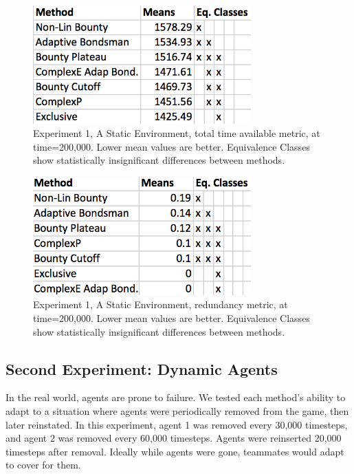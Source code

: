 \documentclass[letterpaper]{aamas2015}
\begin{document}
\begin{figure}[t]
\begin{center}\includegraphics[width=3.3in]{staticT.png}\end{center}
\vspace{-0.5em}\caption{Experiment 1, A Static Environment, total time available metric, at time=200,000.  Lower mean values are better.  Equivalence Classes show statistically insignificant differences between methods.}
\label{staticT}
\end{figure}

\begin{figure}[t]
\begin{center}\includegraphics[width=3.3in]{staticR.png}\end{center}
\vspace{-0.5em}\caption{Experiment 1, A Static Environment, redundancy metric, at time=200,000.  Lower mean values are better.  Equivalence Classes show statistically insignificant differences between methods.}
\label{staticR}
\end{figure}

\subsection{Second Experiment: Dynamic Agents}

In the real world, agents are prone to failure. We tested each method's ability to adapt to a situation where agents were periodically removed from the game, then later reinstated.  In this experiment, agent 1 was removed every 30,000 timesteps, and agent 2 was removed every 60,000 timesteps.  Agents were reinserted 20,000 timesteps after removal.  Ideally while agents were gone,  teammates would adapt to cover for them.
\end{document}
